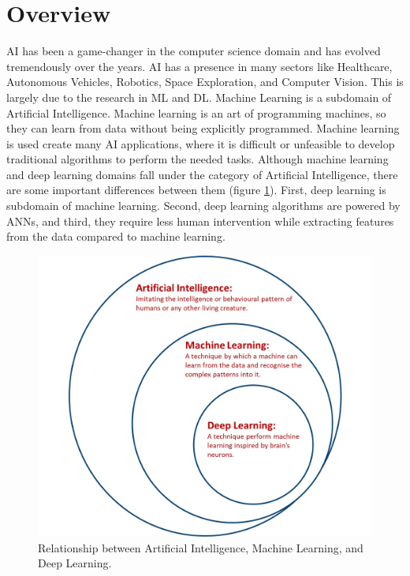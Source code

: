 \justifying
\setlength{\parskip}{1em}


\section{Overview}

\ac{AI} has been a game-changer in the computer science domain and has evolved tremendously over the years\cite{goodfellow2017deep}. \ac{AI} has a presence in many sectors like Healthcare\cite{Yu.2018}, Autonomous Vehicles\cite{Yurtsever_2020}, Robotics\cite{10.1007/978-3-642-82153-0_2}, Space Exploration\cite{Girimonte2007}, and Computer Vision\cite{2020}. This is largely due to the research in \ac{ML} and \ac{DL}. Machine Learning is a subdomain of Artificial Intelligence. Machine learning is an art of programming machines, so they can learn from data without being explicitly programmed. Machine learning is used create many \ac{AI} applications, where it is difficult or unfeasible to develop traditional algorithms to perform the needed tasks. Although machine learning and deep learning domains fall under the category of Artificial Intelligence, there are some important differences between them (figure \ref{fig:deepLearningSubset}). First, deep learning is subdomain of machine learning. Second, deep learning algorithms are powered by \acp{ANN}, and third, they require less human intervention while extracting features from the data compared to machine learning.


\begin{figure}[H]
        \begin{center}
 	    \includegraphics[scale=0.25]{images/Introduction/deeplearningsubset.jpg}
	    \caption[Relationship between Artificial Intelligence, Machine Learning, and Deep Learning.]{Relationship between Artificial Intelligence, Machine Learning, and Deep Learning.}
	    \label{fig:deepLearningSubset}
	    \end{center}
\end{figure}


